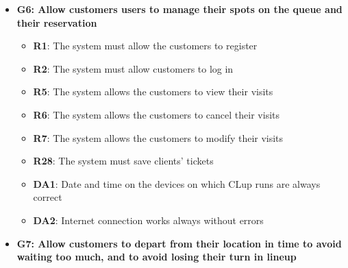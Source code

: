 \documentclass{article}
\begin{document}
\begin{itemize}
				\item {\bfseries G6: Allow customers users to manage their spots on the queue and their reservation}	

					\begin{itemize}
						\item {\bfseries R1}: The system must allow the customers to register
						\item {\bfseries R2}: The system must allow customers to log in
						\item {\bfseries R5}: The system allows the customers to view their visits
						\item {\bfseries R6}: The system allows the customers to cancel their visits
						\item {\bfseries R7}: The system allows the customers to modify their visits
						\item {\bfseries R28}: The system must save clients’ tickets \\
		
						\item {\bfseries DA1}: Date and time on the devices on which CLup runs are always correct
						\item {\bfseries DA2}: Internet connection works always without errors
							
					\end{itemize}

				 
				
				\item {\bfseries G7: Allow customers to depart from their location in time to avoid waiting too much, and to avoid losing their turn in lineup}	


\end{itemize}
\end{document}
